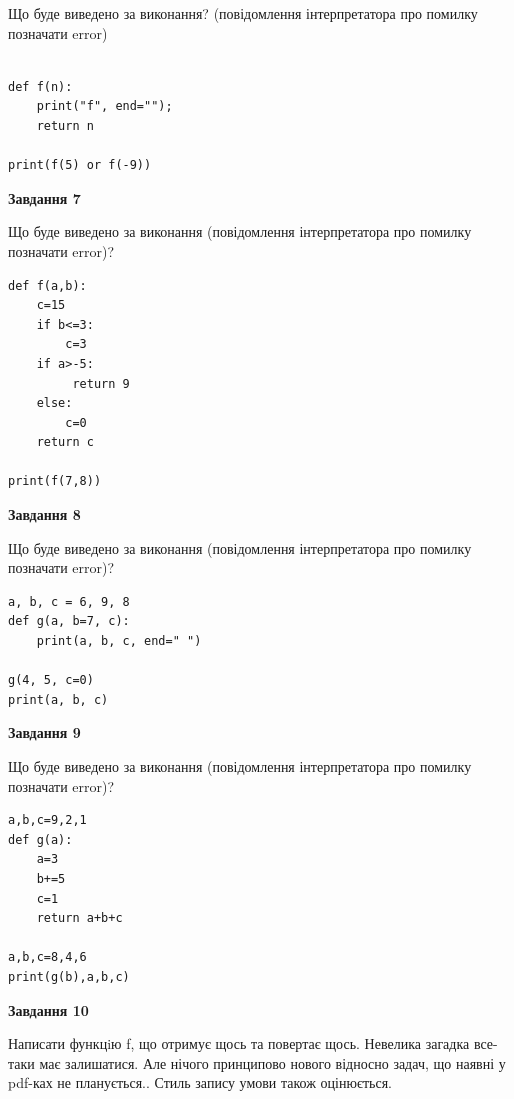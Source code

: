 \documentclass[12pt, ukrainian]{article}
\begin{document}
{\begin {large}
Що буде виведено за виконання? (повідомлення інтерпретатора про помилку позначати error)\par
\begin{verbatim}

def f(n):
    print("f", end="");
    return n

print(f(5) or f(-9))
\end{verbatim}

{\begin {center}\textbf{Завдання 7}\end {center}}

Що буде виведено за виконання (повідомлення інтерпретатора про помилку позначати error)?\par
\begin{verbatim}
def f(a,b):
    c=15
    if b<=3:
        c=3
    if a>-5:
         return 9
    else: 
        c=0
    return c

print(f(7,8))
\end{verbatim}

{\begin {center}\textbf{Завдання 8}\end {center}}

Що буде виведено за виконання (повідомлення інтерпретатора про помилку позначати error)?\par
\begin{verbatim}
a, b, c = 6, 9, 8
def g(a, b=7, c):
    print(a, b, c, end=" ")

g(4, 5, c=0)
print(a, b, c)
\end{verbatim}

{\begin {center}\textbf{Завдання 9}\end {center}}

Що буде виведено за виконання (повідомлення інтерпретатора про помилку позначати error)?\par
\begin{verbatim}
a,b,c=9,2,1
def g(a):
    a=3
    b+=5
    c=1
    return a+b+c

a,b,c=8,4,6
print(g(b),a,b,c)
\end{verbatim}

{\begin {center}\textbf{Завдання 10}\end {center}}


Написати функцiю f, що отримує щось та повертає щось. Невелика загадка все-таки має залишатися. Але нічого принципово нового відносно задач, що наявні у pdf-ках не планується.. Стиль запису умови також оцінюється.\par
\end {large}}
\newpage
\end{document}

